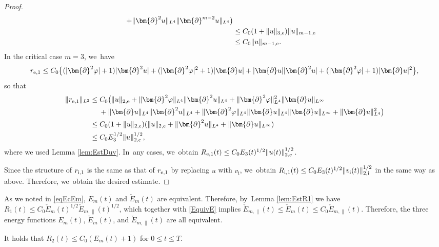 \begin{proof}
\begin{align*}
+ \|\bm{\partial}^2u\|_{L^4}\|\bm{\partial}^{m-2}u\|_{L^4} \bigr) \\
&\leq C_0(1+\|u\|_{3,{\rm e}})\|u\|_{m-1,{\rm e}} \\
&\leq C_0\|u\|_{m-1,{\rm e}}.
\end{align*}
In the critical case $m=3$, we~have
\[
r_{{\rm e},1}
\leq C_0 \bigl\{ (|\bm{\partial}^2\varphi|+1)|\bm{\partial}^2u| + (|\bm{\partial}^2\varphi|^2+1)|\bm{\partial}u|
+ |\bm{\partial}u||\bm{\partial}^2u| + (|\bm{\partial}^2\varphi|+1)|\bm{\partial}u|^2\bigr\},
\]
so that
\begin{align*}
\|r_{{\rm e},1}\|_{L^2}
&\leq C_0 \bigl(\|u\|_{2,{\rm e}} + \|\bm{\partial}^2\varphi\|_{L^4}\|\bm{\partial}^2u\|_{L^4} + \|\bm{\partial}^2\varphi\|_{L^4}^2\|\bm{\partial}u\|_{L^\infty} \\
&\quad\;
+ \|\bm{\partial}u\|_{L^4}\|\bm{\partial}^2u\|_{L^4} + \|\bm{\partial}^2\varphi\|_{L^4}\|\bm{\partial}u\|_{L^4}\|\bm{\partial}u\|_{L^\infty}
+ \|\bm{\partial}u\|_{L^4}^2 \bigr) \\
&\leq C_0 (1+\|u\|_{2,{\rm e}})(\|u\|_{2,{\rm e}}+\|\bm{\partial}^2u\|_{L^4}+\|\bm{\partial}u\|_{L^\infty}) \\
&\leq C_0 E_3^{1/2} \|u\|_{2,{\rm e}}^{1/2},
\end{align*}
where we used Lemma \ref{lem:EstDuv}. In~any cases, we~obtain $R_{{\rm e},1}(t) \leq C_0 E_3(t)^{1/2} \|u(t)\|_{2,{\rm e}}^{1/2}$.

Since the structure of $r_{{\rm i},1}$ is the same as that of $r_{{\rm e},1}$ by replacing $u$ with $v_\mathrm{i}$, we~obtain $R_{{\rm i},1}(t) \leq C_0 E_3(t)^{1/2} \|v_\mathrm{i}(t)\|_{2,{\rm i}}^{1/2}$ in the same way as above.
Therefore, we~obtain the desired estimate.
\end{proof}

\begin{remark}\label{re:EFs}
As we noted in \eqref{eqEcEm}, $E_m(t)$ and $\check{E}_m(t)$ are equivalent.
Therefore, by~Lemma \ref{lem:EstR1} we have $R_1(t) \leq C_0\check{E}_m(t)^{1/2}\check{E}_{m,\parallel}(t)^{1/2}$,
which together with \eqref{EquivE} implies $\check{E}_{m,\parallel}(t) \leq \check{E}_m(t) \leq C_0\check{E}_{m,\parallel}(t)$.
Therefore, the three energy functions $E_m(t)$, $\check{E}_m(t)$, and $\check{E}_{m,\parallel}(t)$ are all equivalent.
\end{remark}

\begin{lemma}\label{lem:EstR2}
It holds that $R_2(t) \leq C_0(E_m(t)+1)$ for $0\leq t\leq T$.
\end{lemma}

